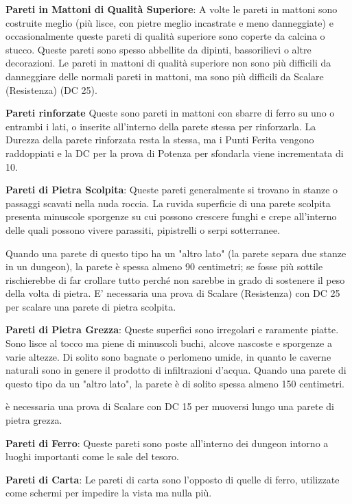 \documentclass[a4paper,11pt,twoside,openany]{book}
\begin{document}
\textbf{Pareti in Mattoni di Qualità Superiore}: A volte le pareti in mattoni sono costruite meglio (più lisce, con pietre meglio incastrate e meno danneggiate) e occasionalmente queste pareti di qualità superiore sono coperte da calcina o stucco. Queste pareti sono spesso abbellite da dipinti, bassorilievi o altre decorazioni. Le pareti in mattoni di qualità superiore non sono più difficili da danneggiare delle normali pareti in mattoni, ma sono più difficili da Scalare (Resistenza) (DC 25).

\textbf{Pareti rinforzate} Queste sono pareti in mattoni con sbarre di ferro su uno o entrambi i lati, o inserite all’interno della parete stessa per rinforzarla. La Durezza della parete rinforzata resta la stessa, ma i Punti Ferita vengono raddoppiati e la DC per la prova di Potenza per sfondarla viene incrementata di 10.

\textbf{Pareti di Pietra Scolpita}: Queste pareti generalmente si trovano in stanze o passaggi scavati nella nuda roccia. La ruvida superficie di una parete scolpita presenta minuscole sporgenze su cui possono crescere funghi e crepe all'interno delle quali possono vivere parassiti, pipistrelli o serpi sotterranee.

Quando una parete di questo tipo ha un "altro lato" (la parete separa due stanze in un dungeon), la parete è spessa almeno 90 centimetri; se fosse più sottile rischierebbe di far crollare tutto perché non sarebbe in grado di sostenere il peso della volta di pietra. E' necessaria una prova di Scalare (Resistenza) con DC 25 per scalare una parete di pietra scolpita.

\textbf{Pareti di Pietra Grezza}: Queste superfici sono irregolari e raramente piatte. Sono lisce al tocco ma piene di minuscoli buchi, alcove nascoste e sporgenze a varie altezze. Di solito sono bagnate o perlomeno umide, in quanto le caverne naturali sono in genere il prodotto di infiltrazioni d'acqua. Quando una parete di questo tipo da un "altro lato", la parete è di solito spessa almeno 150 centimetri.

è necessaria una prova di Scalare con DC 15 per muoversi lungo una parete di pietra grezza.

\textbf{Pareti di Ferro}: Queste pareti sono poste all'interno dei dungeon intorno a luoghi importanti come le sale del tesoro.

\textbf{Pareti di Carta}: Le pareti di carta sono l'opposto di quelle di ferro, utilizzate come schermi per impedire la vista ma nulla più.
\end{document}
